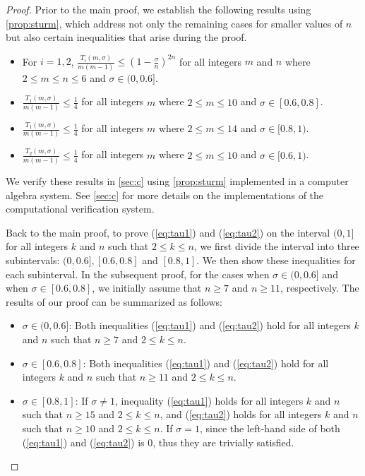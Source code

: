 \documentclass{article}
\theoremstyle{plain}
\theoremstyle{definition}
\theoremstyle{remark}
\def\bigopen#1{\left(#1\right)}
\begin{document}
\begin{proof}
Prior to the main proof, we establish the following results using \cref{prop:sturm}, which address not only the remaining cases for smaller values of $n$ but also certain inequalities that arise during the proof.
\begin{itemize}
    \item For $i=1,2$, $\frac{T_i(m,\sigma)}{m(m-1)} \le \bigopen{1-\frac{\sigma}{n}}^{2n}$ for all integers $m$ and $n$ where $2 \le m \le n \le 6$ and $\sigma \in (0, 0.6]$.
    \item $\frac{T_1(m,\sigma)}{m(m-1)} \le \frac{1}{4}$ for all integers $m$ where $2\le m\le 10$ and $\sigma \in [0.6, 0.8]$.
    \item $\frac{T_1(m,\sigma)}{m(m-1)} \le \frac{1}{4}$ for all integers $m$ where $2\le m\le 14$ and $\sigma \in [0.8, 1)$.
    \item $\frac{T_2(m,\sigma)}{m(m-1)} \le \frac{1}{4}$ for all integers $m$ where $2\le m\le 10$ and $\sigma \in [0.6, 1)$.
\end{itemize}
We verify these results in \cref{sec:c} using \cref{prop:sturm} implemented in a computer algebra system.
See \cref{sec:c} for more details on the implementations of the computational verification system.

Back to the main proof, to prove (\ref{eq:tau1}) and (\ref{eq:tau2}) on the interval $(0, 1]$ for all integers $k$ and $n$ such that $2\le k\le n$, we first divide the interval into three subintervals: $(0, 0.6], [0.6, 0.8]$ and $[0.8, 1]$. We then show these inequalities for each subinterval.
In the subsequent proof, for the cases when $\sigma \in (0, 0.6]$ and when $\sigma \in [0.6, 0.8]$, we initially assume that $n \ge 7$ and $n\ge 11$, respectively. The results of our proof can be summarized as follows:
\begin{itemize}
    \item $\sigma \in (0, 0.6]$: Both inequalities (\ref{eq:tau1}) and (\ref{eq:tau2}) hold for all integers $k$ and $n$ such that $n\ge 7$ and $2\le k\le n$.
    \item $\sigma \in [0.6, 0.8]$: Both inequalities (\ref{eq:tau1}) and (\ref{eq:tau2}) hold for all integers $k$ and $n$ such that $n\ge 11$ and $2\le k\le n$.
    \item $\sigma \in [0.8, 1]$: If $\sigma \ne 1$, inequality (\ref{eq:tau1}) holds for all integers $k$ and $n$ such that $n\ge 15$ and $2\le k\le n$, and (\ref{eq:tau2}) holds for all integers $k$ and $n$ such that $n\ge 10$ and $2\le k\le n$. If $\sigma=1$, since the left-hand side of both (\ref{eq:tau1}) and (\ref{eq:tau2}) is $0$, thus they are trivially satisfied.
\end{itemize}


\end{proof}
\end{document}
